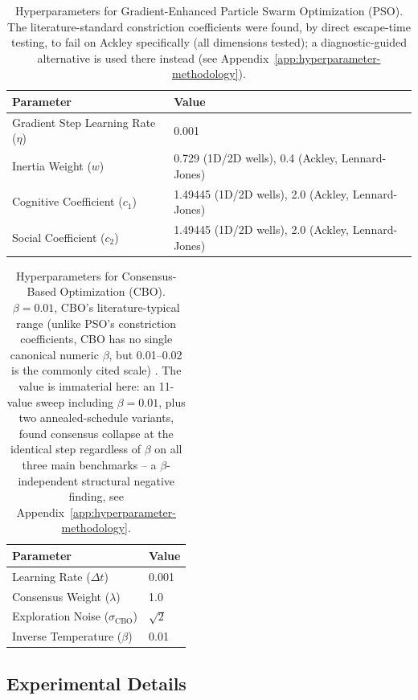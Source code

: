 \documentclass{article}
\theoremstyle{plain}
\theoremstyle{definition}
\theoremstyle{remark}
\begin{document}
\begin{table}[!htbp]
\centering
\caption{Hyperparameters for Gradient-Enhanced Particle Swarm Optimization (PSO). The literature-standard constriction coefficients were found, by direct escape-time testing, to fail on Ackley specifically (all dimensions tested); a diagnostic-guided alternative is used there instead (see Appendix~\ref{app:hyperparameter-methodology}).}
\label{tab:pso_hyperparams}
\begin{tabular}{@{}ll@{}}
\toprule
\textbf{Parameter} & \textbf{Value} \\
\midrule
Gradient Step Learning Rate ($\eta$) & 0.001 \\
Inertia Weight ($w$) & 0.729 (1D/2D wells), 0.4 (Ackley, Lennard-Jones) \\
Cognitive Coefficient ($c_1$) & 1.49445 (1D/2D wells), 2.0 (Ackley, Lennard-Jones) \\
Social Coefficient ($c_2$) & 1.49445 (1D/2D wells), 2.0 (Ackley, Lennard-Jones) \\
\bottomrule
\end{tabular}
\end{table}

\begin{table}[!htbp]
\centering
\caption{Hyperparameters for Consensus-Based Optimization (CBO). $\beta=0.01$, CBO's literature-typical range (unlike PSO's constriction coefficients, CBO has no single canonical numeric $\beta$, but 0.01--0.02 is the commonly cited scale) . The value is immaterial here: an 11-value sweep including $\beta=0.01$, plus two annealed-schedule variants, found consensus collapse at the identical step regardless of $\beta$ on all three main benchmarks -- a $\beta$-independent structural negative finding, see Appendix~\ref{app:hyperparameter-methodology}.}
\label{tab:cbo_hyperparams}
\begin{tabular}{@{}ll@{}}
\toprule
\textbf{Parameter} & \textbf{Value} \\
\midrule
Learning Rate ($\Delta t$) & 0.001 \\
Consensus Weight ($\lambda$) & 1.0 \\
Exploration Noise ($\sigma_{\text{CBO}}$) & $\sqrt{2}$ \\
Inverse Temperature ($\beta$) & 0.01 \\
\bottomrule
\end{tabular}
\end{table}

\subsection{Experimental Details}
\label{apx:experiment-details}
\end{document}
